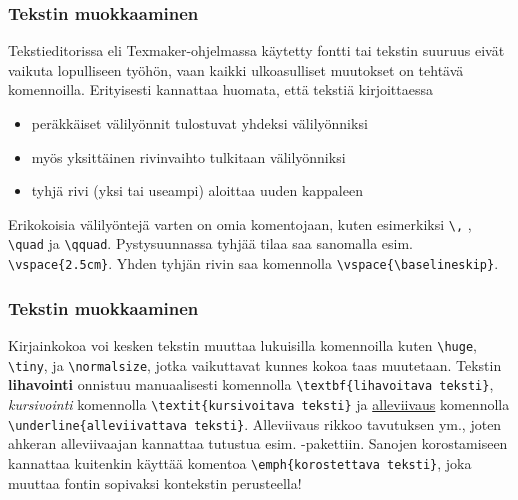 \begin{frame}
    
\end{frame}

\begin{frame}[fragile]
    \frametitle{Tekstin muokkaaminen}
    Tekstieditorissa eli Texmaker-ohjelmassa käytetty fontti tai tekstin suuruus eivät vaikuta lopulliseen työhön, vaan kaikki ulkoasulliset muutokset on tehtävä komennoilla.%
    \vaihto\pause
    Erityisesti kannattaa huomata, että tekstiä kirjoittaessa
    \begin{itemize}[<+->]
        \item peräkkäiset välilyönnit tulostuvat yhdeksi välilyönniksi
        \item myös yksittäinen rivinvaihto tulkitaan välilyönniksi
        \item tyhjä rivi (yksi tai useampi) aloittaa uuden kappaleen
    \end{itemize}
    \pause
    Erikokoisia välilyöntejä varten on omia komentojaan, kuten esimerkiksi \lstinline-\,- , \lstinline-\quad- ja \lstinline-\qquad-.
    \vaihto\pause Pystysuunnassa tyhjää tilaa saa sanomalla esim. \lstinline-\vspace{2.5cm}-. Yhden tyhjän rivin saa komennolla \lstinline-\vspace{\baselineskip}-.
\end{frame}

%

\begin{frame}[fragile]
    \frametitle{Tekstin muokkaaminen}
    Kirjainkokoa voi kesken tekstin muuttaa lukuisilla komennoilla kuten \lstinline-\huge-, \lstinline-\tiny-, ja \lstinline-\normalsize-, jotka vaikuttavat kunnes kokoa taas muutetaan. 
    \vaihto\pause
    Tekstin \textbf{lihavointi} onnistuu manuaalisesti komennolla \lstinline-\textbf{lihavoitava teksti}-, \textit{kursivointi} komennolla \lstinline-\textit{kursivoitava teksti}- ja \underline{alleviivaus} komennolla \lstinline-\underline{alleviivattava teksti}-. Alleviivaus rikkoo tavutuksen ym., joten ahkeran alleviivaajan kannattaa tutustua esim. -pakettiin.
    \vaihto\pause
    Sanojen korostamiseen kannattaa kuitenkin käyttää komentoa \verb-\emph{korostettava teksti}-, joka muuttaa fontin sopivaksi kontekstin perusteella!
\end{frame}

